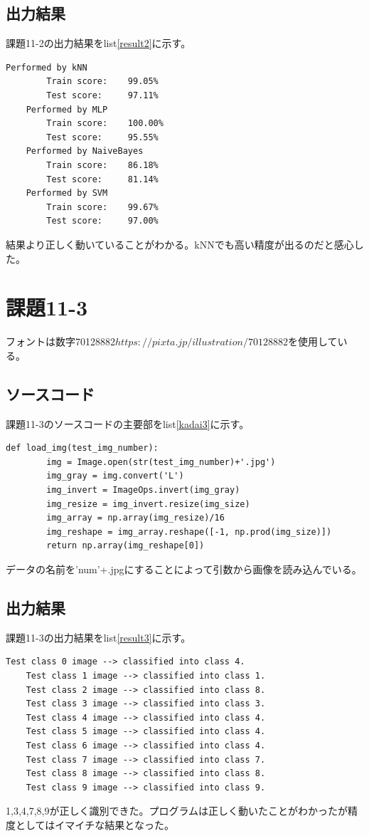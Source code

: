 \documentclass[a4paper]{ltjsarticle}
\begin{document}
\subsection*{出力結果}
課題11-2の出力結果をlist\ref{result2}に示す。
\begin{lstlisting}[caption=output, label=result2]
    Performed by kNN
        Train score:    99.05%
        Test score:     97.11%
    Performed by MLP
        Train score:    100.00%
        Test score:     95.55%
    Performed by NaiveBayes
        Train score:    86.18%
        Test score:     81.14%
    Performed by SVM
        Train score:    99.67%
        Test score:     97.00%
\end{lstlisting}
結果より正しく動いていることがわかる。kNNでも高い精度が出るのだと感心した。
\newpage

\section*{課題11-3}
フォントは数字70128882\( https://pixta.jp/illustration/70128882 \)を使用している。
\subsection*{ソースコード}
課題11-3のソースコードの主要部をlist\ref{kadai3}に示す。
\begin{lstlisting}[caption=kadai11-3.py, label=kadai3]
    def load_img(test_img_number):
        img = Image.open(str(test_img_number)+'.jpg')
        img_gray = img.convert('L')
        img_invert = ImageOps.invert(img_gray)
        img_resize = img_invert.resize(img_size)
        img_array = np.array(img_resize)/16
        img_reshape = img_array.reshape([-1, np.prod(img_size)])
        return np.array(img_reshape[0])
\end{lstlisting}
データの名前を'num'+.jpgにすることによって引数から画像を読み込んでいる。

\subsection*{出力結果}
課題11-3の出力結果をlist\ref{result3}に示す。
\begin{lstlisting}[caption=output, label=result3]
    Test class 0 image --> classified into class 4.
    Test class 1 image --> classified into class 1.
    Test class 2 image --> classified into class 8.
    Test class 3 image --> classified into class 3.
    Test class 4 image --> classified into class 4.
    Test class 5 image --> classified into class 4.
    Test class 6 image --> classified into class 4.
    Test class 7 image --> classified into class 7.
    Test class 8 image --> classified into class 8.
    Test class 9 image --> classified into class 9.
\end{lstlisting}
1,3,4,7,8,9が正しく識別できた。プログラムは正しく動いたことがわかったが精度としてはイマイチな結果となった。
\end{document}

